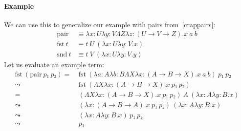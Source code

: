 \documentclass[12pt]{article}
\begin{document}
\paragraph{Example}
We can use this to generalize our example with pairs from~\ref{crappairs}:
\begin{align*}
    \mathrm{pair} &≡ λx:Uλy:VΛZλz:(U → V → Z).x \ a \ b\\
    \mathrm{fst} \ t &≡ t \ U \ (λx:Uλy:V.x)\\
    \mathrm{snd} \ t &≡ t \ V \ (λx:Uλy:V.y)
\end{align*}
Let us evaluate an example term:
\begin{align*}
    \mathrm{fst} \ (\mathrm{pair} \ p₁ \ p₂) =& \ \mathrm{fst} \ (λa:Aλb:BΛXλx:(A → B → X).x \ a \ b) \ p₁ \ p₂\\
    \leadsto& \ \mathrm{fst} \ (ΛXλx:(A → B → X).x \ p₁ \ p₂)\\
    =& \ (ΛXλx:(A → B → X).x \ p₁ \ p₂) \ A \ (λx:Aλy:B.x)\\
    \leadsto& \ (λx:(A → B → A).x \ p₁ \ p₂) \ (λx:Aλy:B.x)\\
    \leadsto& \ (λx:Aλy:B.x) \ p₁ \ p₂\\
    \leadsto& \ p₁\\
\end{align*}
\end{document}
